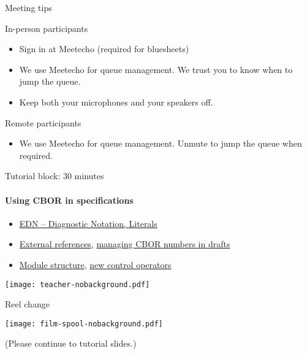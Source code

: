\documentclass[aspectratio=169]{beamer}
\begin{document}
\begin{frame}{Meeting tips}
    \begin{block}{\small In-person participants}
      \begin{itemize}
        \item Sign in at Meetecho (required for bluesheets)
        \item We use Meetecho for queue management. We trust you to know when to jump the queue.
        \item Keep both your microphones and your speakers off.
      \end{itemize}
    \end{block}

    \begin{block}{\small Remote participants}
      \begin{itemize}
        \item We use Meetecho for queue management. Unmute to jump the queue when required.
      \end{itemize}
    \end{block}
\end{frame}

\begin{frame}{Tutorial block: 30 minutes}\large
    \framesubtitle{Using CBOR in specifications}
    \begin{itemize}
        \item \href{https://datatracker.ietf.org/doc/draft-ietf-cbor-edn-literals/}{EDN -- Diagnostic Notation, Literals}
        \item \href{https://datatracker.ietf.org/doc/draft-bormann-cbor-e-ref/}{External references}, \href{https://datatracker.ietf.org/doc/draft-bormann-cbor-draft-numbers/}{managing CBOR numbers in drafts}
        \item \href{https://datatracker.ietf.org/doc/draft-ietf-cbor-cddl-modules/}{Module structure}, \href{https://datatracker.ietf.org/doc/draft-ietf-cbor-cddl-more-control/}{new control operators}
    \end{itemize}

    \vspace{-1cm}
    \begin{block}{\texttt{[image: teacher-nobackground.pdf]}\mbox{\quad}}
    \end{block}
\end{frame}

\begin{frame}{Reel change}
    \begin{block}{\texttt{[image: film-spool-nobackground.pdf]}\mbox{\quad}}
        \mbox{}

        \vspace{-1.7cm}

        (Please continue to tutorial slides.)
    \end{block}
\end{frame}
\end{document}
